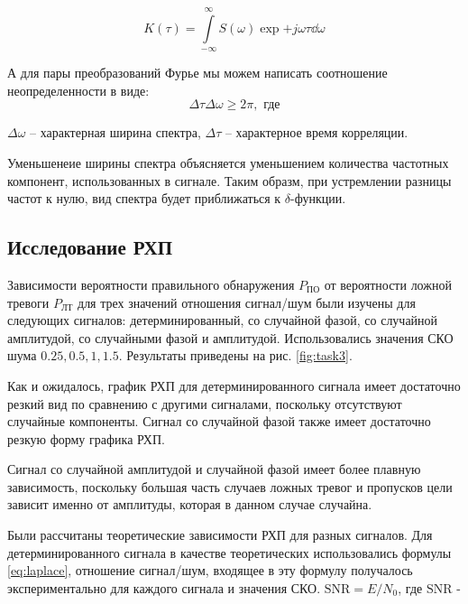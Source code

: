 \begin{equation}
    K(\tau) = \int\limits_{-\infty}^{\infty} S(\omega) \exp{+j\omega\tau} \dd{\omega}
\end{equation}

А для пары преобразований Фурье мы можем написать соотношение неопределенности
в виде:
\begin{equation}
    \Delta \tau  \Delta \omega \geq 2\pi, \text{ где}
\end{equation} 

$\Delta \omega$ -- характерная ширина спектра, $\Delta \tau$ -- характерное время корреляции.

Уменьшенеие ширины спектра объясняется уменьшением количества частотных компонент, использованных 
в сигнале. Таким образм, при устремлении разницы частот к нулю, вид спектра будет приближаться к $\delta$-функции.


\subsection{Исследование РХП}
Зависимости вероятности правильного
обнаружения $P_\text{ПО}$ от вероятности ложной тревоги $P_\text{ЛТ}$ для трех значений
отношения сигнал/шум были изучены для следующих сигналов: детерминированный, со случайной фазой,
со случайной амплитудой, со случайными фазой и амплитудой. Использовались значения СКО шума $0.25, 0.5, 1, 1.5$.
Результаты приведены на рис. \ref{fig:task3}.

Как и ожидалось, график РХП для детерминированного сигнала имеет достаточно резкий вид по сравнению
с другими сигналами, поскольку отсутствуют случайные компоненты.
Сигнал со случайной фазой также имеет достаточно резкую форму графика РХП.

Сигнал со случайной амплитудой и случайной фазой имеет более плавную зависимость, поскольку
большая часть случаев ложных тревог и пропусков цели зависит именно от амплитуды, которая в данном случае случайна.

Были рассчитаны теоретические зависимости РХП для разных сигналов.
Для детерминированного сигнала в качестве теоретических использовались формулы \eqref{eq:laplace},
 отношение сигнал/шум, входящее в эту формулу получалось
 экспериментально для каждого сигнала и значения СКО.
$\text{SNR} = E/N_0$, где $\text{SNR}$ -

